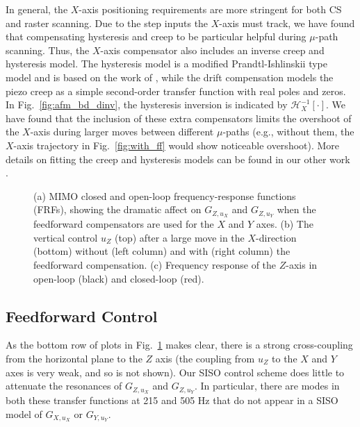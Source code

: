 \documentclass[journal]{IEEEtran}
\begin{document}
In general, the $X$-axis positioning requirements are more stringent
for both CS and raster scanning. Due to the step inputs the $X$-axis
must track, we have found that compensating hysteresis and creep to be
particular helpful during $\mu$-path scanning. Thus, the $X$-axis
compensator also includes an inverse creep and hysteresis model. The
hysteresis model is a modified Prandtl-Ishlinskii type model and is
based on the work of \cite{kuhnen_modeling_2003}, while the drift
compensation models the piezo creep as a simple second-order transfer
function with real poles and zeros. In Fig.~\ref{fig:afm_bd_dinv}, the
hysteresis inversion is indicated by $\mathcal{H}_X^{-1}[\cdot]$. We
have found that the inclusion of these extra compensators limits the
overshoot of the $X$-axis during larger moves between different
$\mu$-paths (e.g., without them, the $X$-axis trajectory in
Fig.~\ref{fig:with_ff} would show noticeable overshoot). More details
on fitting the creep and hysteresis models can be found in our other
work \cite{braker_afmmpc_2019}.

\begin{figure}
  \centering
  \begin{subfigure}[b]{.65\textwidth}
    
    \caption{}\label{fig:mimo_frf_uxuy}
  \end{subfigure}\hfill
  \begin{subfigure}[b]{.34\textwidth}
    
    \caption{}\label{fig:with_ff}
    \vspace{2ex}
    
    \caption{}\label{fig:z_control}
  \end{subfigure}
  \caption{(a) MIMO closed and open-loop frequency-response functions (FRFs), showing the dramatic
    affect on $G_{Z,u_X}$ and $G_{Z,u_Y}$ when the feedforward
    compensators are used for the $X$ and $Y$ axes. (b) The vertical
    control $u_Z$ (top) after a large move in the $X$-direction
    (bottom) without (left column) and with (right column) the
    feedforward compensation. (c) Frequency response of the $Z$-axis
    in open-loop (black) and closed-loop (red). }
\end{figure}

\subsection{Feedforward Control}\label{sec:ff_control}
As the bottom row of plots in
Fig.~\ref{fig:mimo_frf_uxuy} makes clear, there is a strong
cross-coupling from the horizontal plane to the $Z$ axis (the coupling
from $u_Z$ to the $X$ and $Y$ axes is very weak, and so is not shown).
Our SISO control scheme does little to attenuate the resonances of
$G_{Z,u_X}$ and $G_{Z,u_Y}$. In particular, there are modes in both
these transfer functions at 215 and 505 Hz that do not appear in a
SISO model of $G_{X,u_X}$ or $G_{Y,u_Y}$.
\end{document}
